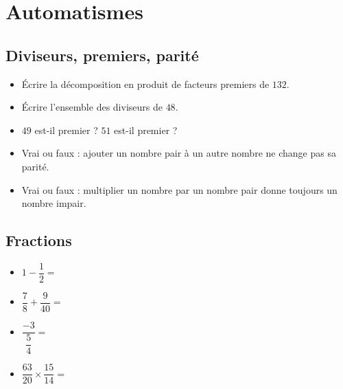 \documentclass[14pt]{beamer}
\begin{document}
\section{Automatismes}


\subsection{Diviseurs, premiers, parité}

\begin{frame}

	\begin{itemize} \itemsep2em 
		\item Écrire la décomposition en produit de facteurs premiers de $132$.
		\item Écrire l'ensemble des diviseurs de $48$.
		\item $49$ est-il premier ? $51$ est-il premier ?
		\item Vrai ou faux : ajouter un nombre pair à un autre nombre ne change pas sa parité.
		\item Vrai ou faux : multiplier un nombre par un nombre pair donne toujours un nombre impair.
	\end{itemize}

\end{frame}


\subsection{Fractions}

\begin{frame}

	\begin{itemize} \itemsep2em 
		\item $1 - \dfrac12 = $
		\item $\dfrac78 + \dfrac{9}{40} = $
		\item $\dfrac{-3}{\dfrac54} = $
		\item $\dfrac{63}{20} \times \dfrac{15}{14} = $
	\end{itemize}


\end{frame}

%
%
%
\end{document}
